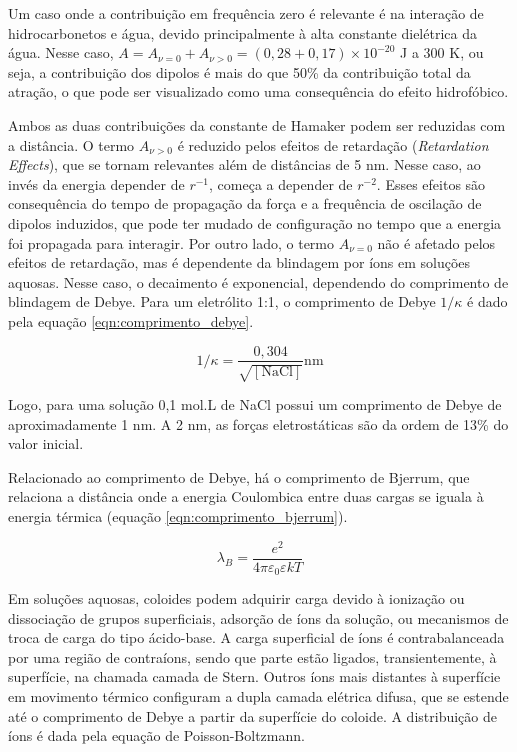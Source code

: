 	Um caso onde a contribuição em frequência zero é relevante é na interação de hidrocarbonetos e água, devido principalmente à alta constante dielétrica da água. Nesse caso, \(A = A_{\nu=0} + A_{\nu>0} = (0,28 + 0,17) \times 10^{-20} \) J a 300 K, ou seja, a contribuição dos dipolos é mais do que 50\% da contribuição total da atração, o que pode ser visualizado como uma consequência do efeito hidrofóbico. %
	
	Ambos as duas contribuições da constante de Hamaker podem ser reduzidas com a distância. O termo \(A_{\nu > 0}\) é reduzido pelos efeitos de retardação (\emph{Retardation Effects}), que se tornam relevantes além de distâncias de 5 nm. Nesse caso, ao invés da energia depender de \(r^{-1}\), começa a depender de \(r^{-2}\). Esses efeitos são consequência do tempo de propagação da força e a frequência de oscilação de dipolos induzidos, que pode ter mudado de configuração no tempo que a energia foi propagada para interagir. Por outro lado, o termo \(A_{\nu = 0}\) não é afetado pelos efeitos de retardação, mas é dependente da blindagem por íons em soluções aquosas. Nesse caso, o decaimento é exponencial, dependendo do comprimento de blindagem de Debye. Para um eletrólito 1:1, o comprimento de Debye \(1/\kappa\) é dado pela equação \ref{eqn:comprimento_debye}.
	
	\begin{equation}
		1/\kappa = \dfrac{0{,}304}{\sqrt{\left[ \mathrm{NaCl} \right] }} \textrm{nm}
		\label{eqn:comprimento_debye}
	\end{equation}
	
	Logo, para uma solução 0,1 mol.L\menosUm{} de NaCl possui um comprimento de Debye de aproximadamente 1 nm. A 2 nm, as forças eletrostáticas são da ordem de 13\% do valor inicial.
	
	Relacionado ao comprimento de Debye, há o comprimento de Bjerrum, que relaciona a distância onde a energia Coulombica entre duas cargas se iguala à energia térmica (equação \ref{eqn:comprimento_bjerrum}).
	
	\begin{equation}
		\lambda_B = \dfrac{e^2}{4 \pi \varepsilon_{ 0 } \varepsilon kT}
		\label{eqn:comprimento_bjerrum}
	\end{equation}
	
	Em soluções aquosas, coloides podem adquirir carga devido à ionização ou dissociação de grupos superficiais, adsorção de íons da solução, ou mecanismos de troca de carga do tipo ácido-base. A carga superficial de íons é contrabalanceada por uma região de contraíons, sendo que parte estão ligados, transientemente, à superfície, na chamada camada de Stern. Outros íons mais distantes à superfície em movimento térmico configuram a dupla camada elétrica difusa, que se estende até o comprimento de Debye a partir da superfície do coloide. A distribuição de íons é dada pela equação de Poisson-Boltzmann.
	
